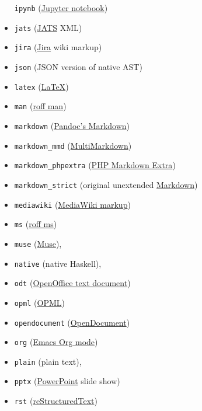 \begin{description}
\begin{itemize}
  \texttt{ipynb}
  (\href{https://nbformat.readthedocs.io/en/latest/}{Jupyter notebook})
\item
  \texttt{jats} (\href{https://jats.nlm.nih.gov}{JATS} XML)
\item
  \texttt{jira}
  (\href{https://jira.atlassian.com/secure/WikiRendererHelpAction.jspa?section=all}{Jira}
  wiki markup)
\item
  \texttt{json} (JSON version of native AST)
\item
  \texttt{latex} (\href{http://latex-project.org}{LaTeX})
\item
  \texttt{man}
  (\href{http://man7.org/linux/man-pages/man7/groff_man.7.html}{roff
  man})
\item
  \texttt{markdown} (\protect\hyperlink{pandocs-markdown}{Pandoc's
  Markdown})
\item
  \texttt{markdown\_mmd}
  (\href{http://fletcherpenney.net/multimarkdown/}{MultiMarkdown})
\item
  \texttt{markdown\_phpextra}
  (\href{https://michelf.ca/projects/php-markdown/extra/}{PHP Markdown
  Extra})
\item
  \texttt{markdown\_strict} (original unextended
  \href{http://daringfireball.net/projects/markdown/}{Markdown})
\item
  \texttt{mediawiki}
  (\href{https://www.mediawiki.org/wiki/Help:Formatting}{MediaWiki
  markup})
\item
  \texttt{ms}
  (\href{http://man7.org/linux/man-pages/man7/groff_ms.7.html}{roff ms})
\item
  \texttt{muse} (\href{https://amusewiki.org/library/manual}{Muse}),
\item
  \texttt{native} (native Haskell),
\item
  \texttt{odt}
  (\href{http://en.wikipedia.org/wiki/OpenDocument}{OpenOffice text
  document})
\item
  \texttt{opml} (\href{http://dev.opml.org/spec2.html}{OPML})
\item
  \texttt{opendocument}
  (\href{http://opendocument.xml.org}{OpenDocument})
\item
  \texttt{org} (\href{http://orgmode.org}{Emacs Org mode})
\item
  \texttt{plain} (plain text),
\item
  \texttt{pptx}
  (\href{https://en.wikipedia.org/wiki/Microsoft_PowerPoint}{PowerPoint}
  slide show)
\item
  \texttt{rst}
  (\href{http://docutils.sourceforge.net/docs/ref/rst/introduction.html}{reStructuredText})

\end{itemize}
\end{description}
